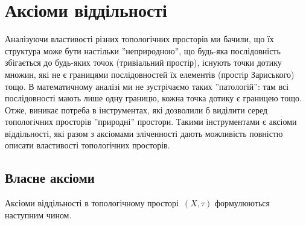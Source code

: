 \chapter{Аксіоми віддільності}

Аналізуючи властивості різних топологічних просторів
ми бачили, що їх структура може бути настільки
''неприродною'', що будь-яка послідовність збігається до
будь-яких точок (тривіальний простір), існують точки
дотику множин, які не є границями послідовностей їх
елементів (простір Зариського) тощо. В математичному
аналізі ми не зустрічаємо таких ''патологій'': там всі
послідовності мають лише одну границю, кожна точка
дотику є границею тощо. Отже, виникає потреба в
інструментах, які дозволили б виділити серед
топологічних просторів ''природні'' простори. Такими
інструментами є аксіоми віддільності, які разом з аксіомами
зліченності дають можливість повністю описати
властивості топологічних просторів.

\section{Власне аксіоми}

Аксіоми віддільності в топологічному просторі~$(X, \tau)$
формулюються наступним чином.

